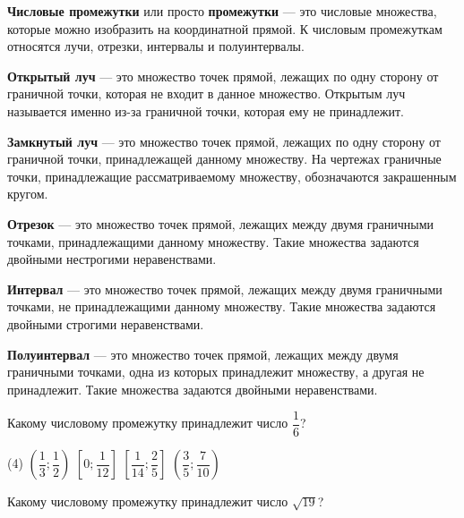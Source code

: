 \begin{class}[number=5]
	\begin{definit}
		\textbf{Числовые промежутки} или просто \textbf{промежутки} --- это числовые множества, которые можно изобразить на координатной прямой. К числовым промежуткам относятся лучи, отрезки, интервалы и полуинтервалы.
	\end{definit}
	\begin{definit}
		\textbf{Открытый луч} --- это множество точек прямой, лежащих по одну сторону от граничной точки, которая не входит в данное множество. Открытым луч называется именно из-за граничной точки, которая ему не принадлежит.
	\end{definit}
	\begin{definit}
		\textbf{Замкнутый луч} --- это множество точек прямой, лежащих по одну сторону от граничной точки, принадлежащей данному множеству. На чертежах граничные точки, принадлежащие рассматриваемому множеству, обозначаются закрашенным кругом.
	\end{definit}
	\begin{definit}
		\textbf{Отрезок} — это множество точек прямой, лежащих между двумя граничными точками, принадлежащими данному множеству. Такие множества задаются двойными нестрогими неравенствами.
	\end{definit}
	\begin{definit}
		\textbf{Интервал} --- это множество точек прямой, лежащих между двумя граничными точками, не принадлежащими данному множеству. Такие множества задаются двойными строгими неравенствами.	
	\end{definit}
	\begin{definit}
		\textbf{Полуинтервал} --- это множество точек прямой, лежащих между двумя граничными точками, одна из которых принадлежит множеству, а другая не принадлежит. Такие множества задаются двойными неравенствами.
	\end{definit}	
	\begin{listofex}
		\item Какому числовому промежутку принадлежит число \( \dfrac{1}{6} \)?
		\begin{tasks}(4)
			\task \( \left( \dfrac{1}{3};\dfrac{1}{2}\right)  \)
			\task \( \left[ 0;\dfrac{1}{12}\right]  \)
			\task \( \left[ \dfrac{1}{14};\dfrac{2}{5}\right]  \)
			\task \( \left( \dfrac{3}{5};\dfrac{7}{10}\right)  \)
		\end{tasks}
		\item Какому числовому промежутку принадлежит число \( \sqrt{19} \)?

\end{listofex}
\end{class}
